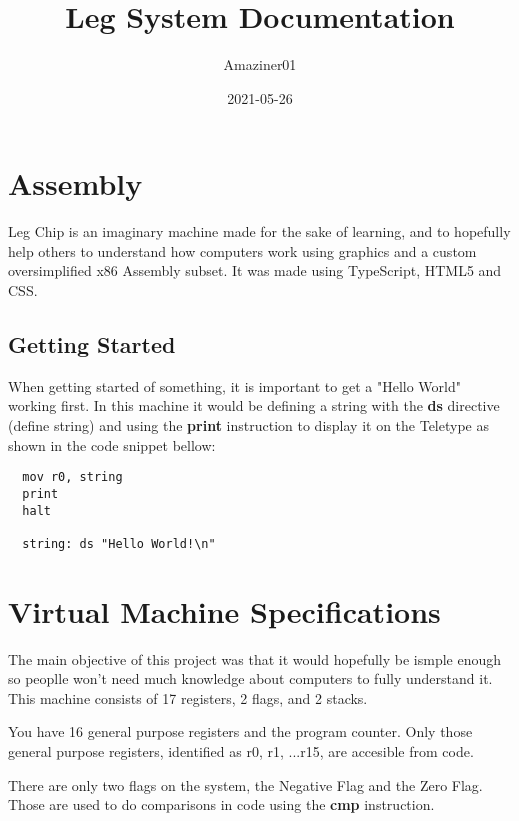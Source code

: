 \documentclass[oneside]{book}
\title{Leg System Documentation}
\date{2021-05-26}
\author{Amaziner01}
\begin{document}
    \maketitle
    \newpage
  
  \tableofcontents
  \clearpage
  
  \chapter{Assembly}
  
  Leg Chip is an imaginary machine made for the sake of learning, and to hopefully help others to understand how computers work using graphics and a custom oversimplified x86 Assembly subset. It was made using TypeScript, HTML5 and CSS.
  
  \section{Getting Started}
  
  When getting started of something, it is important to get a "Hello World" working first. In this machine it would be defining a string with the \textbf{ds} directive (define string) and using the \textbf{print} instruction to display it on the Teletype as shown in the code snippet bellow:
  
  \begin{Verbatim}
  mov r0, string
  print
  halt
  
  string: ds "Hello World!\n"
  \end{Verbatim}
  
  
  \chapter{Virtual Machine Specifications}
  
  The main objective of this project was that it would hopefully be ismple enough so peoplle won't need much knowledge about computers to fully understand it. This machine consists of 17 registers, 2 flags, and 2 stacks.
  
  You have 16 general purpose registers and the program counter. Only those general purpose registers, identified as r0, r1, ...r15, are accesible from code.
  
  There are only two flags on the system, the Negative Flag and the Zero Flag. Those are used to do comparisons in code using the \textbf{cmp} instruction.
  
\end{document}
